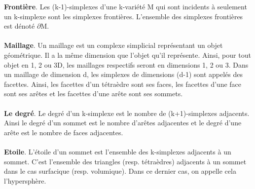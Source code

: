 \textbf{Frontière}. Les (k-1)-simplexes d'une k-variété M qui sont incidents à seulement un k-simplexe sont les simplexes frontières. L'ensemble des simplexes frontières est dénoté $\partial $M.\\\\
\textbf{Maillage}. Un maillage est un complexe simplicial représentant un objet géométrique. Il a la même dimension que l'objet qu'il représente. Ainsi, pour tout objet en 1, 2 ou 3D, les maillages respectifs seront en dimensions 1, 2 ou 3. Dans un maillage de dimension d, les simplexes de dimensions (d-1) sont appelés des facettes. Ainsi, les facettes d'un tétraèdre sont ses faces, les facettes d'une face sont ses arêtes et les facettes d'une arête sont ses sommets.\\\\
\textbf{Le degré}. Le degré d'un k-simplexe est le nombre de (k+1)-simplexes adjacents. Ainsi le degré d'un sommet est le nombre d'arêtes adjacentes et le degré d'une arête est le nombre de faces adjacentes.\\\\
\textbf{Etoile}. L'étoile d'un sommet est l'ensemble des k-simplexes adjacents à un sommet. C'est l'ensemble des triangles (resp. tétraèdres) adjacents à un sommet dans le cas surfacique (resp. volumique). Dans ce dernier cas, on appelle cela l'hypersphère.


